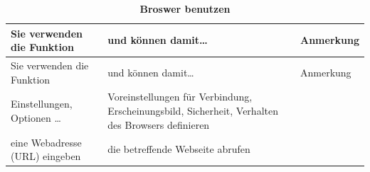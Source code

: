 \documentclass[]{book}
\theoremstyle{definition}
\theoremstyle{definition}
\theoremstyle{definition}
\theoremstyle{remark}
\begin{document}
\begin{longtable}[]{@{}lll@{}}
\caption{\textbf{\label{tab:browser-benutzen} Broswer
benutzen}}\tabularnewline
\toprule
\begin{minipage}[b]{0.31\columnwidth}\raggedright\strut
Sie verwenden die Funktion\strut
\end{minipage} & \begin{minipage}[b]{0.27\columnwidth}\raggedright\strut
und können damit\ldots{}\strut
\end{minipage} & \begin{minipage}[b]{0.33\columnwidth}\raggedright\strut
Anmerkung\strut
\end{minipage}\tabularnewline
\midrule
\endfirsthead
\toprule
\begin{minipage}[b]{0.31\columnwidth}\raggedright\strut
Sie verwenden die Funktion\strut
\end{minipage} & \begin{minipage}[b]{0.27\columnwidth}\raggedright\strut
und können damit\ldots{}\strut
\end{minipage} & \begin{minipage}[b]{0.33\columnwidth}\raggedright\strut
Anmerkung\strut
\end{minipage}\tabularnewline
\midrule
\endhead
\begin{minipage}[t]{0.31\columnwidth}\raggedright\strut
Einstellungen, Optionen \ldots{} \vspace{5mm}\strut
\end{minipage} & \begin{minipage}[t]{0.27\columnwidth}\raggedright\strut
Voreinstellungen für Verbindung, Erscheinungsbild, Sicherheit, Verhalten
des Browsers definieren \vspace{5mm}\strut
\end{minipage} & \begin{minipage}[t]{0.33\columnwidth}\raggedright\strut
\strut
\end{minipage}\tabularnewline
\begin{minipage}[t]{0.31\columnwidth}\raggedright\strut
eine Webadresse (URL) eingeben \vspace{5mm}\strut
\end{minipage} & \begin{minipage}[t]{0.27\columnwidth}\raggedright\strut
die betreffende Webseite abrufen\strut
\end{minipage} & \begin{minipage}[t]{0.33\columnwidth}\raggedright\strut
\strut
\end{minipage}\tabularnewline

\end{longtable}
\end{document}

